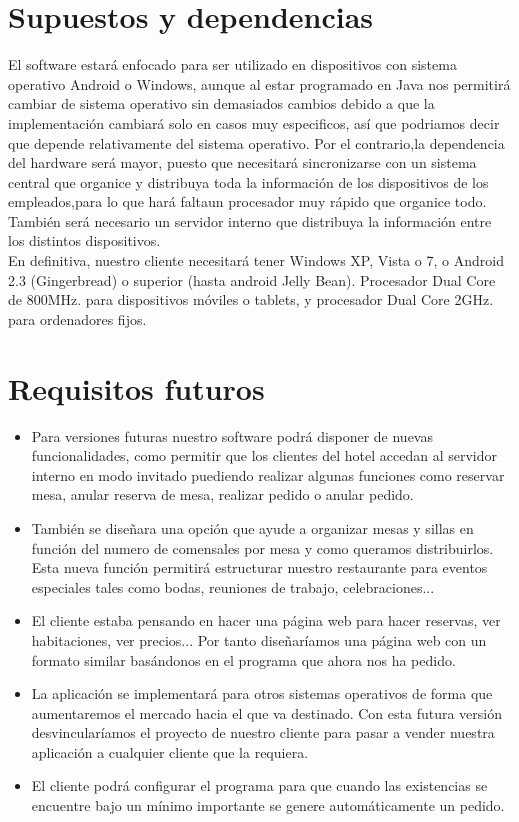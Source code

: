 \documentclass[spanish,a4paper,11pt, twoside]{report}	%
\begin{document}
\section{Supuestos y dependencias}	
	El software estará enfocado para ser utilizado en dispositivos con sistema operativo Android o Windows, aunque al estar programado en Java  nos permitirá cambiar de sistema operativo sin demasiados cambios debido a que la implementación cambiará solo en casos muy especificos, así que podriamos decir que depende relativamente del sistema operativo.  Por el contrario,la dependencia del hardware será mayor, puesto que necesitará sincronizarse con un sistema central que organice y distribuya toda la información de los dispositivos de los empleados,para lo que hará faltaun procesador muy rápido que organice todo. También será necesario un servidor interno que distribuya la información entre los distintos dispositivos.	\\

En definitiva,  nuestro cliente necesitará tener Windows XP, Vista o 7, o Android 2.3 (Gingerbread) o superior (hasta android Jelly Bean).
Procesador Dual Core de 800MHz. para dispositivos móviles o tablets, y procesador Dual Core 2GHz. para ordenadores fijos.

\section{Requisitos futuros}
	\begin{itemize}
		\item Para versiones futuras nuestro software podrá disponer de nuevas funcionalidades, como permitir que los clientes del hotel accedan al servidor interno en modo invitado puediendo realizar algunas funciones como reservar mesa, anular reserva de mesa, realizar pedido o anular pedido.

		\item También se diseñara una opción que ayude a organizar mesas y sillas en función del numero de comensales por mesa y como queramos distribuirlos. Esta nueva función permitirá estructurar nuestro restaurante para eventos especiales tales como bodas, reuniones de trabajo, celebraciones...

		\item El cliente estaba pensando en hacer una página web para hacer reservas, ver habitaciones, ver precios... Por tanto diseñaríamos una página web con un formato similar basándonos en el programa que ahora nos ha pedido.

		\item La aplicación se implementará para otros sistemas operativos de forma que aumentaremos el mercado hacia el que va destinado. Con esta futura versión desvincularíamos el proyecto de nuestro cliente para pasar a vender nuestra aplicación a cualquier cliente que la requiera.
		
		\item El cliente podrá configurar el programa para que cuando las existencias se encuentre bajo un mínimo importante se genere automáticamente un pedido.
	\end{itemize}
\end{document}

